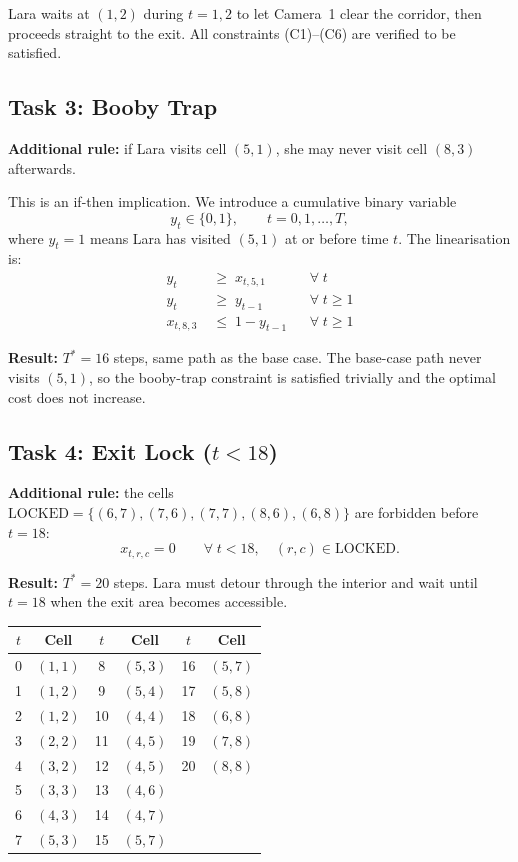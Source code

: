 \documentclass[12pt,a4paper]{article}
\begin{document}
Lara waits at $(1,2)$ during $t=1,2$ to let Camera~1 clear the corridor, then proceeds
straight to the exit. All constraints (C1)--(C6) are verified to be satisfied.

\subsection*{Task 3: Booby Trap}

\textbf{Additional rule:} if Lara visits cell $(5,1)$, she may never visit cell $(8,3)$
afterwards.

This is an if-then implication. We introduce a cumulative binary variable
\[
  y_t \in \{0,1\}, \qquad t=0,1,\ldots,T,
\]
where $y_t=1$ means Lara has visited $(5,1)$ at or before time $t$. The linearisation is:
\begin{align*}
  y_t &\;\geq\; x_{t,5,1} && \forall\;t \tag{trap triggered}\\
  y_t &\;\geq\; y_{t-1}   && \forall\;t\geq 1 \tag{stays triggered}\\
  x_{t,8,3} &\;\leq\; 1-y_{t-1} && \forall\;t\geq 1 \tag{block $(8,3)$ after trap}
\end{align*}

\textbf{Result:} $T^*=16$ steps, same path as the base case. The base-case path never visits
$(5,1)$, so the booby-trap constraint is satisfied trivially and the optimal cost does not
increase.

\subsection*{Task 4: Exit Lock ($t<18$)}

\textbf{Additional rule:} the cells
$\mathrm{LOCKED}=\{(6,7),(7,6),(7,7),(8,6),(6,8)\}$
are forbidden before $t=18$:
\[
  x_{t,r,c}=0 \qquad \forall\;t<18,\quad(r,c)\in\mathrm{LOCKED}.
\]

\textbf{Result:} $T^*=20$ steps. Lara must detour through the interior and wait until
$t=18$ when the exit area becomes accessible.

\begin{center}
\begin{tabular}{cc|cc|cc}
\toprule
$t$ & Cell & $t$ & Cell & $t$ & Cell \\
\midrule
 0 & $(1,1)$ &  8 & $(5,3)$ & 16 & $(5,7)$ \\
 1 & $(1,2)$ &  9 & $(5,4)$ & 17 & $(5,8)$ \\
 2 & $(1,2)$ & 10 & $(4,4)$ & 18 & $(6,8)$ \\
 3 & $(2,2)$ & 11 & $(4,5)$ & 19 & $(7,8)$ \\
 4 & $(3,2)$ & 12 & $(4,5)$ & 20 & $(8,8)$ \\
 5 & $(3,3)$ & 13 & $(4,6)$ & & \\
 6 & $(4,3)$ & 14 & $(4,7)$ & & \\
 7 & $(5,3)$ & 15 & $(5,7)$ & & \\
\bottomrule
\end{tabular}
\end{center}
\end{document}
